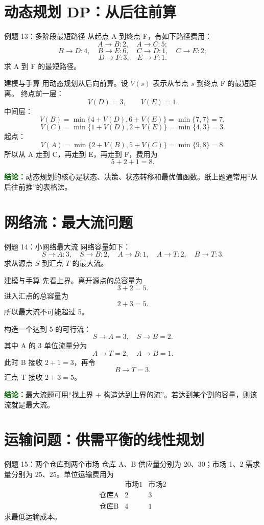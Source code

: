 \documentclass[UTF8,12pt,a4paper]{ctexart}
\newcommand{\conclusion}[1]{\par\smallskip\noindent\textcolor{darkgreen}{\textbf{结论：}}#1\par\smallskip}
\begin{document}
\section{动态规划 DP：从后往前算}
\begin{examplebox}{例题 13：多阶段最短路径}
从起点 A 到终点 F，有如下路径费用：
\[
A\to B:2,
\quad A\to C:5;
\]
\[
B\to D:4,
\quad B\to E:6,
\quad C\to D:1,
\quad C\to E:2;
\]
\[
D\to F:3,
\quad E\to F:1.
\]
求 A 到 F 的最短路径。
\end{examplebox}

\begin{solbox}{建模与手算}
用动态规划从后向前算。设 $V(s)$ 表示从节点 $s$ 到终点 F 的最短距离。
终点前一层：
\[
V(D)=3,
\qquad V(E)=1.
\]
中间层：
\[
V(B)=\min\{4+V(D),6+V(E)\}=\min\{7,7\}=7,
\]
\[
V(C)=\min\{1+V(D),2+V(E)\}=\min\{4,3\}=3.
\]
起点：
\[
V(A)=\min\{2+V(B),5+V(C)\}=\min\{9,8\}=8.
\]
所以从 A 走到 C，再走到 E，再走到 F，费用为
\[
5+2+1=8.
\]
\end{solbox}
\conclusion{动态规划的核心是状态、决策、状态转移和最优值函数。纸上题通常用“从后往前推”的表格法。}

\section{网络流：最大流问题}
\begin{examplebox}{例题 14：小网络最大流}
网络容量如下：
\[
S\to A:3,
\quad S\to B:2,
\quad A\to B:1,
\quad A\to T:2,
\quad B\to T:3.
\]
求从源点 $S$ 到汇点 $T$ 的最大流。
\end{examplebox}

\begin{solbox}{建模与手算}
先看上界。离开源点的总容量为
\[
3+2=5.
\]
进入汇点的总容量为
\[
2+3=5.
\]
所以最大流不可能超过 5。

构造一个达到 5 的可行流：
\[
S\to A=3,
\quad S\to B=2.
\]
其中 A 的 3 单位流量分为
\[
A\to T=2,
\quad A\to B=1.
\]
此时 B 接收 $2+1=3$，再令
\[
B\to T=3.
\]
汇点 T 接收 $2+3=5$。
\end{solbox}
\conclusion{最大流题可用“找上界 + 构造达到上界的流”。若达到某个割的容量，则该流就是最大流。}

\section{运输问题：供需平衡的线性规划}
\begin{examplebox}{例题 15：两个仓库到两个市场}
仓库 A、B 供应量分别为 20、30；市场 1、2 需求量分别为 25、25。单位运输费用为
\[
\begin{array}{c|cc}
&\text{市场1}&\text{市场2}\\
\hline
\text{仓库A}&2&3\\
\text{仓库B}&4&1
\end{array}
\]
求最低运输成本。
\end{examplebox}
\end{document}
